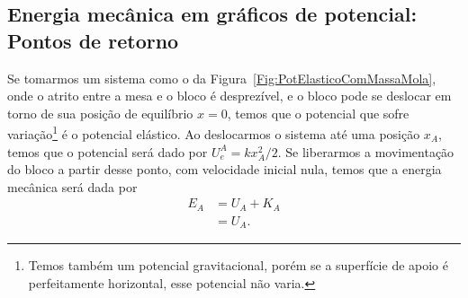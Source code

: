 \subsection{Energia mecânica em gráficos de potencial: Pontos de retorno}

Se tomarmos um sistema como o da Figura~\ref{Fig:PotElasticoComMassaMola}, onde o atrito entre a mesa e o bloco é desprezível, e o bloco pode se deslocar em torno de sua posição de equilíbrio $x = 0$, temos que o potencial que sofre variação\footnote{Temos também um potencial gravitacional, porém se a superfície de apoio é perfeitamente horizontal, esse potencial não varia.} é o potencial elástico. Ao deslocarmos o sistema até uma posição $x_A$, temos que o potencial será dado por $U_e^A = kx_A^2 /2$. Se liberarmos a movimentação do bloco a partir desse ponto, com velocidade inicial nula, temos que a energia mecânica será dada por
\begin{align}
  E_A &= U_A + K_A \\
  &= U_A.
\end{align}

